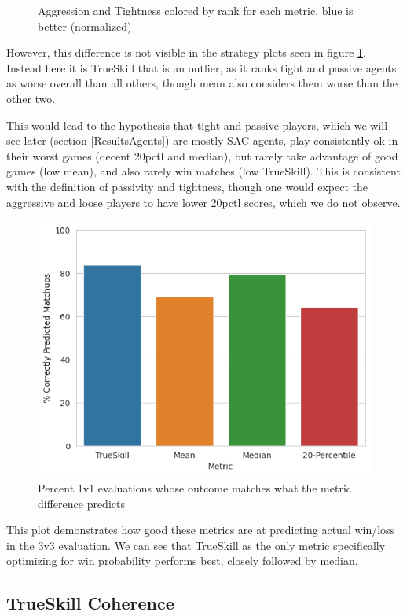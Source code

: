 \begin{figure}[H]
{}
\caption{Aggression and Tightness colored by rank for each metric, blue is better (normalized)}
\label{AggTightRank}
\end{figure}

However, this difference is not visible in the strategy plots seen in figure \ref{AggTightRank}. Instead here it is TrueSkill that is an outlier, as it ranks tight and passive agents as worse overall than all others, though mean also considers them worse than the other two.

This would lead to the hypothesis that tight and passive players, which we will see later (section \ref{ResultsAgents}) are mostly SAC agents, play consistently ok in their worst games (decent 20pctl and median), but rarely take advantage of good games (low mean), and also rarely win matches (low TrueSkill). This is consistent with the definition of passivity and tightness, though one would expect the aggressive and loose players to have lower 20pctl scores, which we do not observe.


\begin{figure}[H]
\centering
    \includegraphics[width=0.8\linewidth]{Results/figures/upsets_per_metric.png}
\caption{Percent 1v1 evaluations whose outcome matches what the metric difference predicts}
\label{UpsetsPlot}
\end{figure}

This plot demonstrates how good these metrics are at predicting actual win/loss in the 3v3 evaluation. We can see that TrueSkill as the only metric specifically optimizing for win probability performs best, closely followed by median.


\subsection{TrueSkill Coherence}


